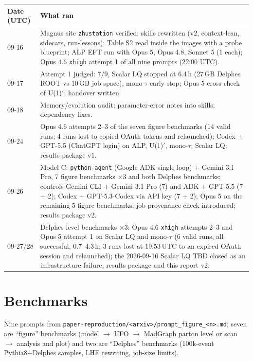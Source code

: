 \documentclass[10pt,a4paper]{article}
\newcommand{\code}[1]{\texttt{#1}}
\begin{document}
\begin{center}\small
\begin{tabular}{lp{14.5cm}}
\toprule
Date (UTC) & What ran \\
\midrule
09-16 & Magnus site \code{zhustation} verified; skills rewritten (v2, context-lean, sidecars, run-lessons); Table S2 read inside the images with a probe blueprint; ALP EFT run with Opus 5, Opus 4.8, Sonnet 5 (1 each); Opus 4.6 \code{xhigh} attempt 1 of all nine prompts (22:00 UTC). \\
09-17 & Attempt 1 judged: 7/9, Scalar LQ stopped at 6.4\,h (27\,GB Delphes ROOT vs 10\,GB job space), mono-$\tau$ early stop; Opus 5 cross-check of U(1)$'$; handover written. \\
09-18 & Memory/evolution audit; parameter-error notes into skills; dependency fixes. \\
09-24 & Opus 4.6 attempts 2--3 of the seven figure benchmarks (14 valid runs; 4 runs lost to copied OAuth tokens and relaunched); Codex + GPT-5.5 (ChatGPT login) on ALP, U(1)$'$, mono-$\tau$, Scalar LQ; results package v1. \\
09-26 & Model C: \code{python-agent} (Google ADK single loop) + Gemini 3.1 Pro, 7 figure benchmarks $\times$3 and both Delphes benchmarks; controls Gemini CLI + Gemini 3.1 Pro (7) and ADK + GPT-5.5 (7 + 2); Codex + GPT-5.3-Codex via API key (7 + 2); Opus 5 on the remaining 5 figure benchmarks; job-provenance check introduced; results package v2. \\
09-27/28 & Delphes-level benchmarks $\times$3: Opus 4.6 \code{xhigh} attempts 2--3 and Opus 5 attempt 1 on Scalar LQ and mono-$\tau$ (6 valid runs, all successful, 0.7--4.3\,h; 3 runs lost at 19:53\,UTC to an expired OAuth session and relaunched); the 2026-09-16 Scalar LQ TBD closed as an infrastructure failure; results package and this report v2. \\
\bottomrule
\end{tabular}
\end{center}

\section{Benchmarks}
Nine prompts from \code{paper-reproduction/<arxiv>/prompt\_figure\_<n>.md}; seven are ``figure'' benchmarks (model $\to$ UFO $\to$ MadGraph parton level or scan $\to$ analysis and plot) and two are ``Delphes'' benchmarks (100k-event Pythia8+Delphes samples, LHE rewriting, job-size limits).
\end{document}
